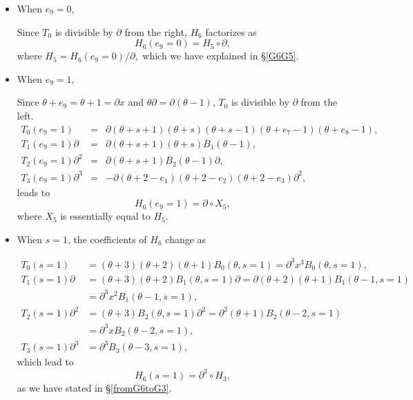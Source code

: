 \documentclass[a4paper,12pt]{article}
\theoremstyle{definition}
\theoremstyle{remark}
\numberwithin{equation}{section} %
\begin{document}
 \begin{itemize}
   
 \item When $e_9=0$,\par\noindent
 Since $T_0$ is divisible by $\partial$ from the right, $H_6$ factorizes as
 $$H_6(e_9=0)=H_5\circ \partial,$$ where $H_5=H_6(e_9=0)/\partial,$ which we have explained in \S \ref{G6G5}.
 
\item When $e_9=1$,\par\noindent
Since $\theta+e_9=\theta+1=\partial x$ and $\theta\partial=\partial(\theta-1)$,
$T_0$ is divisible by $\partial$ from the left.   $$ \begin{array}{lcl}
 T_0(e_9=1)&=&\partial (\theta+s+1)(\theta+s)(\theta+s-1)(\theta +e_7-1)(\theta +e_8-1),\\
 T_1(e_9=1)\partial &=&\partial (\theta+s+1)(\theta+s)B_1(\theta -1),\\
 T_2(e_9=1)\partial ^2&=&\partial (\theta+s+1)B_2(\theta -1)\partial ,\\
 T_3(e_9=1)\partial ^3&=&-\partial (\theta+2-e_1)(\theta+2-e_2)(\theta+2-e_3)\partial ^2,
 \end{array}$$
leads to $$H_6(e_9=1)=\partial\circ X_5,$$ where $X_5$ is essentially equal to $H_5$.
  
  \item When $s=1$, the coefficients of $H_6$ change as\par\noindent
  $$\begin{array}{ll}
    T_0(s=1)&=(\theta +3)(\theta +2)(\theta +1)B_0(\theta ,s=1)=\partial^3x^3B_0(\theta ,s=1),\\
    T_1(s=1)\partial &=(\theta +3)(\theta +2)B_1(\theta ,s=1)\partial =\partial(\theta +2)(\theta +1)B_1(\theta -1,s=1)\\
    &=\partial ^3x^2B_1(\theta -1,s=1),\\
    T_2(s=1)\partial ^2&=(\theta +3)B_2(\theta ,s=1)\partial ^2=\partial ^2(\theta +1)B_2(\theta -2,s=1)\\
    &=\partial ^3xB_2(\theta -2,s=1),\\
    T_3(s=1)\partial ^3&=\partial ^3B_3(\theta -3,s=1),\end{array}$$
  which lead to
  $$H_6(s=1)=\partial ^3\circ H_3,$$
  as we have stated in \S \ref{fromG6toG3}.
  

\end{itemize}
\end{document}
